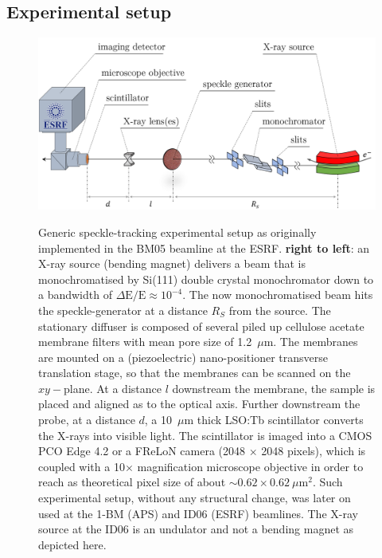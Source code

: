 \begin{refsection}
\subsection{Experimental setup}\label{sec:experimental_setup}

\begin{figure}[t]
        \centering
        {\includegraphics[width=0.7\linewidth]{figures/ch04/BM05.png}}
        \caption[Speckle tracking experimental setup at the BM05 beamline, ESRF.]{Generic speckle-tracking experimental setup as originally implemented in the BM05 beamline at the ESRF. \textbf{right to left}: an X-ray source (bending magnet) delivers a beam that is  monochromatised by Si(111) double crystal monochromator down to a bandwidth of $\Delta \text{E}/\text{E}\approx10^{-4}$. The now monochromatised beam hits the speckle-generator at a distance $R_S$ from the source. The stationary diffuser is composed of several piled up cellulose acetate membrane filters with mean pore size of 1.2~$\mu$m. The membranes are mounted on a (piezoelectric) nano-positioner transverse translation stage, so that the membranes can be scanned on the $xy-$plane. At a distance $l$ downstream the membrane, the sample is placed and aligned as to the optical axis. Further downstream the probe, at a distance $d$, a 10~$\mu$m thick LSO:Tb scintillator converts the X-rays into visible light. The scintillator is imaged into a CMOS PCO Edge 4.2 or a FReLoN camera (2048 $\times$ 2048 pixels), which is coupled with a 10$\times$ magnification microscope objective in order to reach as theoretical pixel size of about $\sim0.62\times0.62~\mu$m$^2$. Such experimental setup, without any structural change, was later on used at the 1-BM (APS) and ID06 (ESRF) beamlines. The X-ray source at the ID06 is an undulator and not a bending magnet as depicted here.} \label{fig:BM05}
\end{figure}


\end{refsection}
